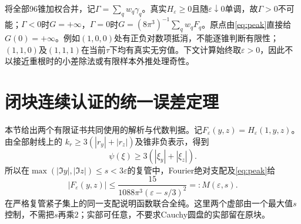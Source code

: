 \documentclass[UTF8,11pt,a4paper,fontset=fandol]{ctexart}
\theoremstyle{definition}\newtheorem{definition}[theorem]{定义}
\theoremstyle{remark}\newtheorem{remark}[theorem]{注}
\newcommand{\abs}[1]{\left|#1\right|}
\begin{document}
将全部96锥加权合并，记$\Gamma=\sum_qw_q\gamma_q$。真实$H_\varepsilon\ge0$且随$\varepsilon\downarrow0$单调，故$\Gamma>0$不可能；$\Gamma<0$时$G=+\infty$，$\Gamma=0$时$G=(8\pi^3)^{-1}\sum_qw_qF_q$。原点由\eqref{eq:peak}直接给$G(0)=+\infty$。例如$(1,0,0)$处有正负对数项抵消，不能逐锥判断有限性；$(1,1,0)$及$(1,1,1)$在当前$\tau$下均有真实无穷值。下文计算始终取$\varepsilon>0$，因此不以接近重根时的小差除法或有限样本外推处理奇性。

\section{闭块连续认证的统一误差定理}
本节给出两个有限证书共同使用的解析与代数判据。记$F_\varepsilon(y,z)=H_\varepsilon(1,y,z)$。由全部射线上的
$k_r\ge3(\abs{r_y}+\abs{r_z})$及锥非负表示，得到
\begin{equation}\label{eq:strip-symbol}
 \psi(\xi)\ge3(\abs{\xi_y}+\abs{\xi_z}).
\end{equation}
所以在$\max(\abs{\Im y},\abs{\Im z})\le s<3\varepsilon$的复管中，Fourier绝对支配及\eqref{eq:peak}给
\begin{equation}\label{eq:tube}
 \abs{F_\varepsilon(y,z)}\le
 \frac{15}{1088\pi^3(\varepsilon-s/3)^2}=:M(\varepsilon,s).
\end{equation}
在严格复管紧子集上的同一支配说明函数联合全纯。这里两个虚部由一个最大值$s$控制，不需把$s$再乘$2$；实部可任意，不要求Cauchy圆盘的实部留在原块。
\end{document}
